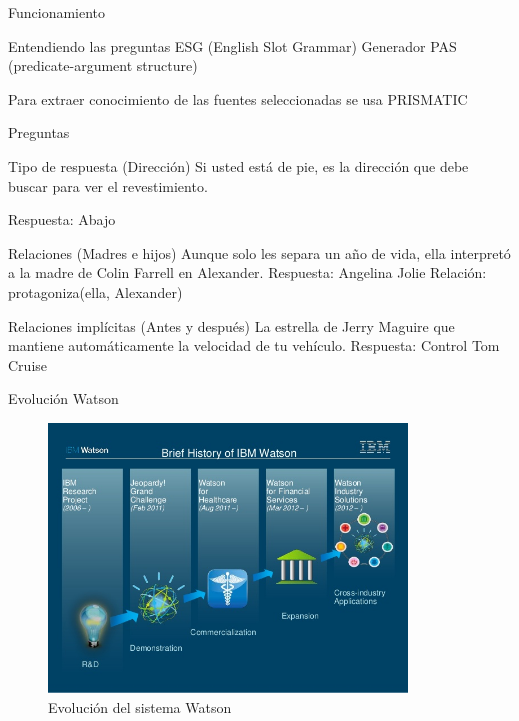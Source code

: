 \documentclass[compress]{beamer}
\begin{document}
\begin{frame}{Funcionamiento}
	\begin{block}{Entendiendo las preguntas}
		ESG (English Slot Grammar)
		Generador PAS (predicate-argument structure)
		
		Para extraer conocimiento de
		las fuentes seleccionadas se usa PRISMATIC
	\end{block}
\end{frame}


\begin{frame}{Preguntas}
	\begin{exampleblock}{Tipo de respuesta (Dirección)}		
		Si usted está de pie, es la dirección que debe buscar para ver el revestimiento.
		
		Respuesta: Abajo
	\end{exampleblock}	

	\begin{exampleblock}{Relaciones (Madres e hijos)}
		Aunque solo les separa un año de vida, ella interpretó a la madre de Colin Farrell en Alexander.
		Respuesta: Angelina Jolie
		Relación: protagoniza(ella, Alexander)
	\end{exampleblock}
	
	\begin{exampleblock}{Relaciones implícitas (Antes y después)}
		La estrella de Jerry Maguire que mantiene automáticamente la velocidad de tu vehículo.
		Respuesta: Control Tom Cruise
	\end{exampleblock}
\end{frame}

\begin{frame}{Evolución Watson}
	\begin{figure}[H]
		\centering
		\label{watson2today}
		\includegraphics[trim = 0mm 14mm 0mm 10mm, clip, width=0.85\textwidth]{./Imagenes/watson2today.jpg}
		\caption{Evolución del sistema Watson}
	\end{figure}
\end{frame}
\end{document}
